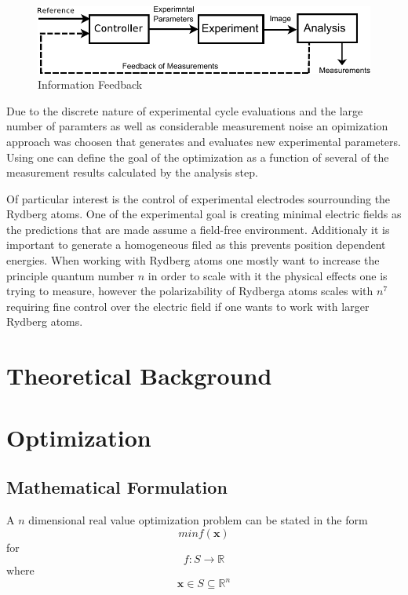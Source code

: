 \documentclass[a4paper,titlepage]{report}
\begin{document}
\begin{figure}[htb]
\centering
\includegraphics{Images/Feedback.pdf}
\caption{Information Feedback}
\label{fig: Information Feedback}
\end{figure}


Due to the discrete nature of experimental cycle evaluations and the large number of paramters as well as considerable measurement noise an opimization approach was choosen that generates and evaluates new experimental parameters. Using one can define the goal of the optimization as a function of several of the measurement results calculated by the analysis step.

Of particular interest is the control of experimental electrodes sourrounding the Rydberg atoms. One of the experimental goal is creating minimal electric fields as the predictions that are made assume a field-free environment. Additionaly it is important to generate a homogeneous filed as this prevents position dependent energies. When working with Rydberg atoms one mostly want to increase the principle quantum number $n$ in order to scale with it the physical effects one is trying to measure, however the polarizability of Rydberga atoms scales with $n^7$ requiring fine control over the electric field if one wants to work with larger Rydberg atoms.



\chapter{Theoretical Background}

\chapter{Optimization}

\section{Mathematical Formulation}
A $n$ dimensional real value optimization problem can be stated in the form
\[ min f(\mathbf{x})  \]
for
\[ f: S \rightarrow  \mathbb{R} \]
where
\[ \mathbf{x} \in S  \subseteq \mathbb{R}^n \]
\end{document}
